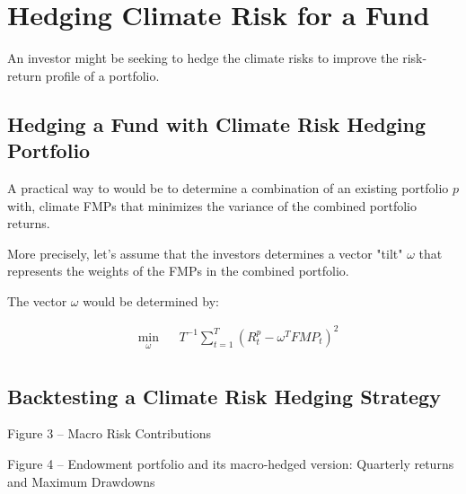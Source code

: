 \chapter{Hedging Climate Risk 
for a Fund}

An investor might be seeking to hedge 
the climate risks to improve 
the risk-return profile of a portfolio.

\section{Hedging a Fund with Climate 
Risk Hedging Portfolio}

A practical way to would be to determine 
a combination of an existing portfolio $p$ with,
climate FMPs that minimizes the variance of 
the combined portfolio returns.

More precisely, let's assume that the 
investors determines a vector "tilt" 
$\omega$ that represents the weights of
the FMPs in the combined portfolio.

The vector $\omega$ would be determined by:

\begin{equation}
    \begin{aligned}
        & \underset{\omega}{\min}
        & &   T^{-1} \sum^T_{t=1} (R^p_t - \omega^T FMP_t)^2\\
    \end{aligned}
\end{equation}


\section{Backtesting a Climate Risk Hedging Strategy}

Figure 3 – Macro Risk Contributions

Figure 4 – Endowment portfolio and its macro-hedged version:
Quarterly returns and Maximum Drawdowns